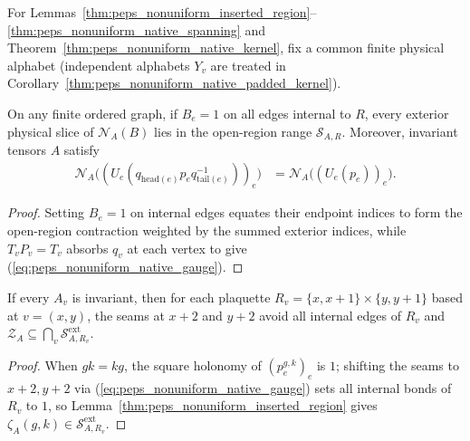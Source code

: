 For Lemmas~\ref{thm:peps_nonuniform_inserted_region}--\ref{thm:peps_nonuniform_native_spanning}
and Theorem~\ref{thm:peps_nonuniform_native_kernel}, fix a common finite physical
alphabet (independent alphabets $Y_v$ are treated in
Corollary~\ref{thm:peps_nonuniform_native_padded_kernel}).

\begin{lemma}%
    \label{thm:peps_nonuniform_inserted_region}
    \leanok
    On any finite ordered graph, if $B_e=1$ on all edges internal to $R$, every
    exterior physical slice of $\mathcal N_A(B)$ lies in the open-region range
    $\mathcal S_{A,R}$. Moreover, invariant tensors $A$ satisfy
    \begin{align}
        \mathcal N_A\bigl((U_e(q_{\mathrm{head}(e)}p_eq_{\mathrm{tail}(e)}^{-1}))_e\bigr)
         & =\mathcal N_A\bigl((U_e(p_e))_e\bigr).
        \label{eq:peps_nonuniform_native_gauge}
    \end{align}
\end{lemma}
\begin{proof}\leanok
    Setting $B_e=1$ on internal edges equates their endpoint indices to form the
    open-region contraction weighted by the summed exterior indices, while
    $T_vP_v=T_v$ absorbs $q_v$ at each vertex to give
    (\ref{eq:peps_nonuniform_native_gauge}).
\end{proof}

\begin{lemma}%
    \label{thm:peps_nonuniform_native_membership}
    \leanok
    If every $A_v$ is invariant, then for each plaquette
    $R_v=\{x,x+1\}\times\{y,y+1\}$ based at $v=(x,y)$, the seams at $x+2$ and
    $y+2$ avoid all internal edges of $R_v$ and
    $\mathcal Z_A\subseteq\bigcap_v\mathcal S_{A,R_v}^{\mathrm{ext}}$.
\end{lemma}
\begin{proof}\leanok
    When $gk=kg$, the square holonomy of $(p^{g,k}_e)_e$ is $1$; shifting the
    seams to $x+2,y+2$ via (\ref{eq:peps_nonuniform_native_gauge}) sets all
    internal bonds of $R_v$ to $1$, so
    Lemma~\ref{thm:peps_nonuniform_inserted_region} gives
    $\zeta_A(g,k)\in\mathcal S_{A,R_v}^{\mathrm{ext}}$.
\end{proof}

